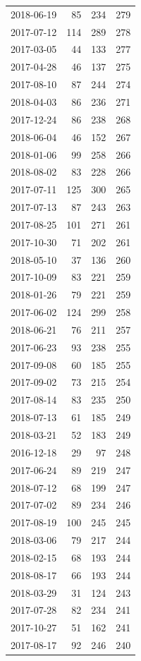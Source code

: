\begin{tabular}{lrrr}
2018-06-19 & 85 & 234 & 279 \\
2017-07-12 & 114 & 289 & 278 \\
2017-03-05 & 44 & 133 & 277 \\
2017-04-28 & 46 & 137 & 275 \\
2017-08-10 & 87 & 244 & 274 \\
2018-04-03 & 86 & 236 & 271 \\
2017-12-24 & 86 & 238 & 268 \\
2018-06-04 & 46 & 152 & 267 \\
2018-01-06 & 99 & 258 & 266 \\
2018-08-02 & 83 & 228 & 266 \\
2017-07-11 & 125 & 300 & 265 \\
2017-07-13 & 87 & 243 & 263 \\
2017-08-25 & 101 & 271 & 261 \\
2017-10-30 & 71 & 202 & 261 \\
2018-05-10 & 37 & 136 & 260 \\
2017-10-09 & 83 & 221 & 259 \\
2018-01-26 & 79 & 221 & 259 \\
2017-06-02 & 124 & 299 & 258 \\
2018-06-21 & 76 & 211 & 257 \\
2017-06-23 & 93 & 238 & 255 \\
2017-09-08 & 60 & 185 & 255 \\
2017-09-02 & 73 & 215 & 254 \\
2017-08-14 & 83 & 235 & 250 \\
2018-07-13 & 61 & 185 & 249 \\
2018-03-21 & 52 & 183 & 249 \\
2016-12-18 & 29 & 97 & 248 \\
2017-06-24 & 89 & 219 & 247 \\
2018-07-12 & 68 & 199 & 247 \\
2017-07-02 & 89 & 234 & 246 \\
2017-08-19 & 100 & 245 & 245 \\
2018-03-06 & 79 & 217 & 244 \\
2018-02-15 & 68 & 193 & 244 \\
2018-08-17 & 66 & 193 & 244 \\
2018-03-29 & 31 & 124 & 243 \\
2017-07-28 & 82 & 234 & 241 \\
2017-10-27 & 51 & 162 & 241 \\
2017-08-17 & 92 & 246 & 240 \\

\end{tabular}
